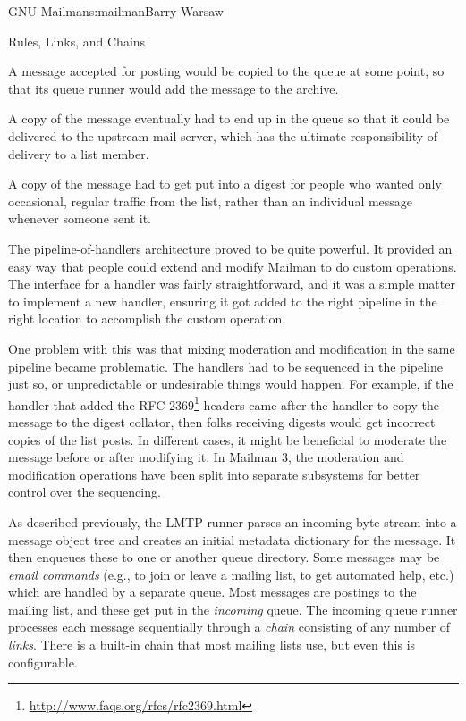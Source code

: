 \begin{aosachapter}{GNU Mailman}{s:mailman}{Barry Warsaw}
\begin{aosasect1}{Rules, Links, and Chains}
\begin{aosaitemize}

\item A message accepted for posting would be copied to the 
  queue at some point, so that its queue runner would add the message
  to the archive.

\item A copy of the message eventually had to end up in the 
  queue so that it could be delivered to the upstream mail server,
  which has the ultimate responsibility of delivery to a list member.

\item A copy of the message had to get put into a digest for people
  who wanted only occasional, regular traffic from the list, rather
  than an individual message whenever someone sent it.

\end{aosaitemize}

The pipeline-of-handlers architecture proved to be quite powerful.  It
provided an easy way that people could extend and modify Mailman to do
custom operations.  The interface for a handler was fairly
straightforward, and it was a simple matter to implement a new
handler, ensuring it got added to the right pipeline in the right
location to accomplish the custom operation.

One problem with this was that mixing moderation and
modification in the same pipeline became problematic.  The handlers
had to be sequenced in the pipeline just so, or unpredictable or
undesirable things would happen.  For example, if the handler that
added the RFC
2369\footnote{\url{http://www.faqs.org/rfcs/rfc2369.html}}
 headers came after the handler to copy the message to
the digest collator, then folks receiving digests would get incorrect
copies of the list posts.  In different cases, it might be beneficial
to moderate the message before or after modifying it.  In Mailman 3,
the moderation and modification operations have been split into
separate subsystems for better control over the sequencing.

As described previously, the LMTP runner parses an incoming byte
stream into a message object tree and creates an initial metadata
dictionary for the message.  It then enqueues these to one or another
queue directory.  Some messages may be \emph{email commands} (e.g., to
join or leave a mailing list, to get automated help, etc.) which are
handled by a separate queue.  Most messages are postings to the
mailing list, and these get put in the \emph{incoming} queue.  The
incoming queue runner processes each message sequentially through a
\emph{chain} consisting of any number of \emph{links}.  There is a
built-in chain that most mailing lists use, but even this is
configurable.


\end{aosasect1}
\end{aosachapter}
